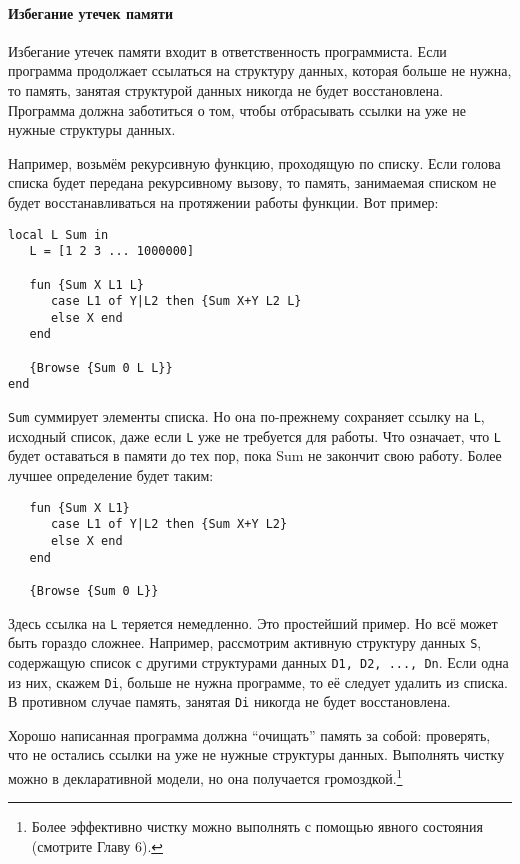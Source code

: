 \paragraph{Избегание утечек памяти}

Избегание утечек памяти входит в ответственность программиста. Если программа продолжает ссылаться на структуру данных, которая больше не нужна, то память, занятая структурой данных никогда не будет восстановлена. Программа должна заботиться о том, чтобы отбрасывать ссылки на уже не нужные структуры данных.

Например, возьмём рекурсивную функцию, проходящую по списку. Если голова списка будет передана рекурсивному вызову, то память, занимаемая списком не будет восстанавливаться на протяжении работы функции. Вот пример:

\begin{lstlisting}
local L Sum in
   L = [1 2 3 ... 1000000]

   fun {Sum X L1 L}
      case L1 of Y|L2 then {Sum X+Y L2 L}
      else X end
   end

   {Browse {Sum 0 L L}}
end
\end{lstlisting}

\lstinline|Sum| суммирует элементы списка. Но она по-прежнему сохраняет ссылку на \lstinline|L|, исходный список, даже если \lstinline|L| уже не требуется для работы. Что означает, что \lstinline|L| будет оставаться в памяти до тех пор, пока Sum не закончит свою работу. Более лучшее определение будет таким:

\begin{lstlisting}
   fun {Sum X L1}
      case L1 of Y|L2 then {Sum X+Y L2}
      else X end
   end

   {Browse {Sum 0 L}}
\end{lstlisting}

Здесь ссылка на \lstinline|L| теряется немедленно. Это простейший пример. Но всё может быть гораздо сложнее. Например, рассмотрим активную структуру данных \lstinline|S|, содержащую список с другими структурами данных \lstinline|D1, D2, ..., Dn|. Если одна из них, скажем \lstinline|Di|, больше не нужна программе, то её следует удалить из списка. В противном случае память, занятая \lstinline|Di| никогда не будет восстановлена.

Хорошо написанная программа должна ``очищать'' память за собой: проверять, что не остались ссылки на уже не нужные структуры данных. Выполнять чистку можно в декларативной модели, но она получается громоздкой.\footnote{Более эффективно чистку можно выполнять с помощью явного состояния (смотрите Главу 6).}

